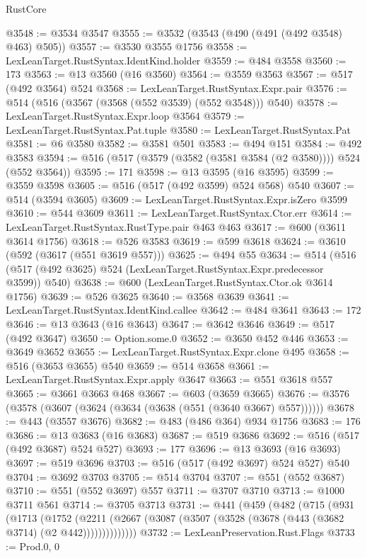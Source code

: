 \begin{lexlean}{RustCore}
\begin{coremodule}
@3548 := @3534 @3547
@3555 := @3532 (@3543 (@490 (@491 (@492 @3548) @463) @505))
@3557 := @3530 @3555 @1756
@3558 := LexLeanTarget.RustSyntax.IdentKind.holder
@3559 := @484 @3558
@3560 := 173
@3563 := @13 @3560 (@16 @3560)
@3564 := @3559 @3563
@3567 := @517 (@492 @3564) @524
@3568 := LexLeanTarget.RustSyntax.Expr.pair
@3576 := @514 (@516 (@3567 (@3568 (@552 @3539) (@552 @3548))) @540)
@3578 := LexLeanTarget.RustSyntax.Expr.loop @3564
@3579 := LexLeanTarget.RustSyntax.Pat.tuple
@3580 := LexLeanTarget.RustSyntax.Pat
@3581 := @6 @3580
@3582 := @3581 @501
@3583 := @494 @151
@3584 := @492 @3583
@3594 := @516 (@517 (@3579 (@3582 (@3581 @3584 (@2 @3580)))) @524 (@552 @3564))
@3595 := 171
@3598 := @13 @3595 (@16 @3595)
@3599 := @3559 @3598
@3605 := @516 (@517 (@492 @3599) @524 @568) @540
@3607 := @514 (@3594 @3605)
@3609 := LexLeanTarget.RustSyntax.Expr.isZero @3599
@3610 := @544 @3609
@3611 := LexLeanTarget.RustSyntax.Ctor.err
@3614 := LexLeanTarget.RustSyntax.RustType.pair @463 @463
@3617 := @600 (@3611 @3614 @1756)
@3618 := @526 @3583
@3619 := @599 @3618
@3624 := @3610 (@592 (@3617 (@551 @3619 @557)))
@3625 := @494 @55
@3634 := @514 (@516 (@517 (@492 @3625) @524 (LexLeanTarget.RustSyntax.Expr.predecessor @3599)) @540)
@3638 := @600 (LexLeanTarget.RustSyntax.Ctor.ok @3614 @1756)
@3639 := @526 @3625
@3640 := @3568 @3639
@3641 := LexLeanTarget.RustSyntax.IdentKind.callee
@3642 := @484 @3641
@3643 := 172
@3646 := @13 @3643 (@16 @3643)
@3647 := @3642 @3646
@3649 := @517 (@492 @3647)
@3650 := Option.some.{0}
@3652 := @3650 @452 @446
@3653 := @3649 @3652
@3655 := LexLeanTarget.RustSyntax.Expr.clone @495
@3658 := @516 (@3653 @3655) @540
@3659 := @514 @3658
@3661 := LexLeanTarget.RustSyntax.Expr.apply @3647
@3663 := @551 @3618 @557
@3665 := @3661 @3663 @468
@3667 := @603 (@3659 @3665)
@3676 := @3576 (@3578 (@3607 (@3624 (@3634 (@3638 (@551 (@3640 @3667) @557))))))
@3678 := @443 (@3557 @3676)
@3682 := @483 (@486 @364) @934 @1756
@3683 := 176
@3686 := @13 @3683 (@16 @3683)
@3687 := @519 @3686
@3692 := @516 (@517 (@492 @3687) @524 @527)
@3693 := 177
@3696 := @13 @3693 (@16 @3693)
@3697 := @519 @3696
@3703 := @516 (@517 (@492 @3697) @524 @527) @540
@3704 := @3692 @3703
@3705 := @514 @3704
@3707 := @551 (@552 @3687)
@3710 := @551 (@552 @3697) @557
@3711 := @3707 @3710
@3713 := @1000 @3711 @561
@3714 := @3705 @3713
@3731 := @441
    (@459
      (@482
        (@715
          (@931
            (@1713
              (@1752
                (@2211 (@2667 (@3087 (@3507 (@3528 (@3678 (@443 (@3682 @3714) (@2 @442))))))))))))))
@3732 := LexLeanPreservation.Rust.Flags
@3733 := Prod.{0, 0}

\end{coremodule}
\end{lexlean}
